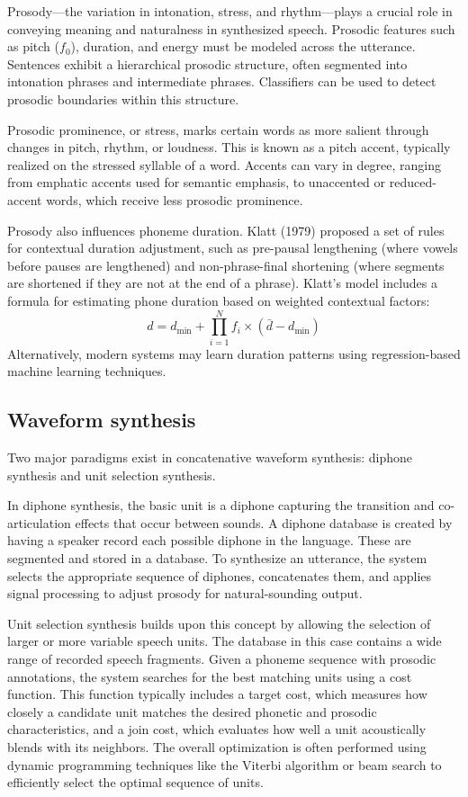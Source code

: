 Prosody—the variation in intonation, stress, and rhythm—plays a crucial role in conveying meaning and naturalness in synthesized speech. 
Prosodic features such as pitch ($f_0$), duration, and energy must be modeled across the utterance. 
Sentences exhibit a hierarchical prosodic structure, often segmented into intonation phrases and intermediate phrases. 
Classifiers can be used to detect prosodic boundaries within this structure.

Prosodic prominence, or stress, marks certain words as more salient through changes in pitch, rhythm, or loudness. 
This is known as a pitch accent, typically realized on the stressed syllable of a word. 
Accents can vary in degree, ranging from emphatic accents used for semantic emphasis, to unaccented or reduced-accent words, which receive less prosodic prominence.

Prosody also influences phoneme duration.
Klatt (1979) proposed a set of rules for contextual duration adjustment, such as pre-pausal lengthening (where vowels before pauses are lengthened) and non-phrase-final shortening (where segments are shortened if they are not at the end of a phrase). 
Klatt's model includes a formula for estimating phone duration based on weighted contextual factors:
\[d=d_{\min}+\prod_{i=1}^{N}f_i\times (\bar{d}-d_{\min})\]
\noindent Alternatively, modern systems may learn duration patterns using regression-based machine learning techniques.

\subsection{Waveform synthesis}
Two major paradigms exist in concatenative waveform synthesis: diphone synthesis and unit selection synthesis.

In diphone synthesis, the basic unit is a diphone capturing the transition and co-articulation effects that occur between sounds. 
A diphone database is created by having a speaker record each possible diphone in the language. 
These are segmented and stored in a database. 
To synthesize an utterance, the system selects the appropriate sequence of diphones, concatenates them, and applies signal processing to adjust prosody for natural-sounding output.

Unit selection synthesis builds upon this concept by allowing the selection of larger or more variable speech units. 
The database in this case contains a wide range of recorded speech fragments.
Given a phoneme sequence with prosodic annotations, the system searches for the best matching units using a cost function. 
This function typically includes a target cost, which measures how closely a candidate unit matches the desired phonetic and prosodic characteristics, and a join cost, which evaluates how well a unit acoustically blends with its neighbors. 
The overall optimization is often performed using dynamic programming techniques like the Viterbi algorithm or beam search to efficiently select the optimal sequence of units.